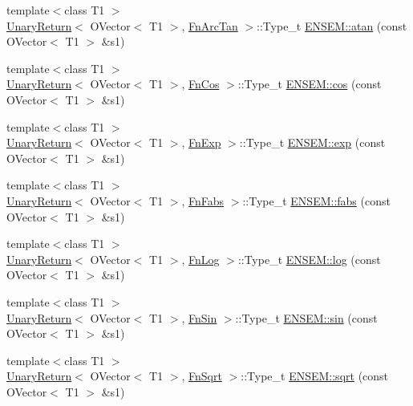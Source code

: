 \begin{DoxyCompactItemize}
{\footnotesize template$<$class T1 $>$ }\\\mbox{\hyperlink{structUnaryReturn}{Unary\+Return}}$<$ O\+Vector$<$ T1 $>$, \mbox{\hyperlink{structFnArcTan}{Fn\+Arc\+Tan}} $>$\+::Type\+\_\+t \mbox{\hyperlink{group__obsvector_ga1e6e98a68854c39f8ca545ad8dbe328d}{E\+N\+S\+E\+M\+::atan}} (const O\+Vector$<$ T1 $>$ \&s1)
\item 
{\footnotesize template$<$class T1 $>$ }\\\mbox{\hyperlink{structUnaryReturn}{Unary\+Return}}$<$ O\+Vector$<$ T1 $>$, \mbox{\hyperlink{structFnCos}{Fn\+Cos}} $>$\+::Type\+\_\+t \mbox{\hyperlink{group__obsvector_ga723a9a3fcfd45943398e215f7702a7a2}{E\+N\+S\+E\+M\+::cos}} (const O\+Vector$<$ T1 $>$ \&s1)
\item 
{\footnotesize template$<$class T1 $>$ }\\\mbox{\hyperlink{structUnaryReturn}{Unary\+Return}}$<$ O\+Vector$<$ T1 $>$, \mbox{\hyperlink{structFnExp}{Fn\+Exp}} $>$\+::Type\+\_\+t \mbox{\hyperlink{group__obsvector_gaff567614c6353e7b44ea426239a64baf}{E\+N\+S\+E\+M\+::exp}} (const O\+Vector$<$ T1 $>$ \&s1)
\item 
{\footnotesize template$<$class T1 $>$ }\\\mbox{\hyperlink{structUnaryReturn}{Unary\+Return}}$<$ O\+Vector$<$ T1 $>$, \mbox{\hyperlink{structFnFabs}{Fn\+Fabs}} $>$\+::Type\+\_\+t \mbox{\hyperlink{group__obsvector_ga0c007ded942b0d671e46d502b7de7294}{E\+N\+S\+E\+M\+::fabs}} (const O\+Vector$<$ T1 $>$ \&s1)
\item 
{\footnotesize template$<$class T1 $>$ }\\\mbox{\hyperlink{structUnaryReturn}{Unary\+Return}}$<$ O\+Vector$<$ T1 $>$, \mbox{\hyperlink{structFnLog}{Fn\+Log}} $>$\+::Type\+\_\+t \mbox{\hyperlink{group__obsvector_gaed658cf17815056e3f361233ba070ae0}{E\+N\+S\+E\+M\+::log}} (const O\+Vector$<$ T1 $>$ \&s1)
\item 
{\footnotesize template$<$class T1 $>$ }\\\mbox{\hyperlink{structUnaryReturn}{Unary\+Return}}$<$ O\+Vector$<$ T1 $>$, \mbox{\hyperlink{structFnSin}{Fn\+Sin}} $>$\+::Type\+\_\+t \mbox{\hyperlink{group__obsvector_ga3731f97921228d0d2c0ad3d05aa88985}{E\+N\+S\+E\+M\+::sin}} (const O\+Vector$<$ T1 $>$ \&s1)
\item 
{\footnotesize template$<$class T1 $>$ }\\\mbox{\hyperlink{structUnaryReturn}{Unary\+Return}}$<$ O\+Vector$<$ T1 $>$, \mbox{\hyperlink{structFnSqrt}{Fn\+Sqrt}} $>$\+::Type\+\_\+t \mbox{\hyperlink{group__obsvector_gaf293f21cc7c65ebe881f87d5214c0e60}{E\+N\+S\+E\+M\+::sqrt}} (const O\+Vector$<$ T1 $>$ \&s1)

\end{DoxyCompactItemize}
